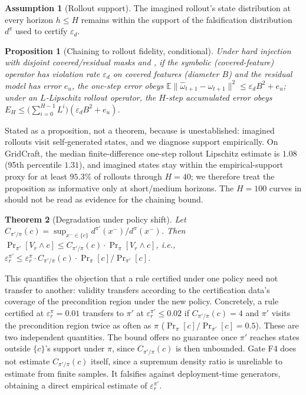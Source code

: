 \documentclass[letterpaper]{article} %
\newcommand{\E}{\mathbb{E}}
\let\autoref\Cref
\theoremstyle{plain}
\newtheorem{theorem}{Theorem}[section]
\newtheorem{proposition}[theorem]{Proposition}
\theoremstyle{definition}
\newtheorem{assumption}{Assumption}[section] %
\theoremstyle{remark}
\begin{document}
\begin{assumption}[Rollout support]
  \label{ass:support}
  The imagined rollout's state distribution at every horizon $h\le H$ remains within the support of the falsification distribution $d^\pi$ used to certify $\varepsilon_d$.
\end{assumption}

\begin{proposition}[Chaining to rollout fidelity, conditional]
  \label{thm:t3}
  Under hard injection with disjoint covered/residual masks and \autoref{ass:support}, if the symbolic (covered-feature) operator has violation rate $\varepsilon_d$ on covered features (diameter $B$) and the residual model has error $e_u$, the one-step error obeys $\E\|\hat\omega_{t+1}-\omega_{t+1}\|^2 \le \varepsilon_d B^2 + e_u$; under an $L$-Lipschitz rollout operator, the $H$-step accumulated error obeys $E_H \le \big(\sum_{i=0}^{H-1}L^i\big)(\varepsilon_d B^2+e_u)$.
\end{proposition}
Stated as a proposition, not a theorem, because \autoref{ass:support} is unestablished: imagined rollouts visit self-generated states, and we diagnose support empirically. On GridCraft, the median finite-difference one-step rollout Lipschitz estimate is $1.08$ (95th percentile $1.31$), and imagined states stay within the empirical-support proxy for at least $95.3\%$ of rollouts through $H=40$; we therefore treat the proposition as informative only at short/medium horizons. The $H=100$ curves in \autoref{sec:exp-gradient} should not be read as evidence for the chaining bound.

\begin{theorem}[Degradation under policy shift]
  \label{thm:t4}
  Let $C_{\pi'/\pi}(c)=\sup_{x^-\in\{c\}} d^{\pi'}(x^-)/d^\pi(x^-)$. Then $\Pr_{\pi'}[V_r\wedge c] \le C_{\pi'/\pi}(c)\cdot\Pr_\pi[V_r\wedge c]$, i.e., $\varepsilon^{\pi'}_r \le \varepsilon^\pi_r\cdot C_{\pi'/\pi}(c)\cdot \Pr_\pi[c]/\Pr_{\pi'}[c]$.
\end{theorem}
This quantifies the objection that a rule certified under one policy need not transfer to another: validity transfers according to the certification data's coverage of the precondition region under the new policy. Concretely, a rule certified at $\varepsilon^\pi_r=0.01$ transfers to $\pi'$ at $\varepsilon^{\pi'}_r\le0.02$ if $C_{\pi'/\pi}(c)=4$ and $\pi'$ visits the precondition region twice as often as $\pi$ ($\Pr_\pi[c]/\Pr_{\pi'}[c]=0.5$). These are two independent quantities. The bound offers no guarantee once $\pi'$ reaches states outside $\{c\}$'s support under $\pi$, since $C_{\pi'/\pi}(c)$ is then unbounded. Gate F4 does not estimate $C_{\pi'/\pi}(c)$ itself, since a supremum density ratio is unreliable to estimate from finite samples. It falsifies against deployment-time generators, obtaining a direct empirical estimate of $\varepsilon^{\pi'}_r$.
\end{document}

